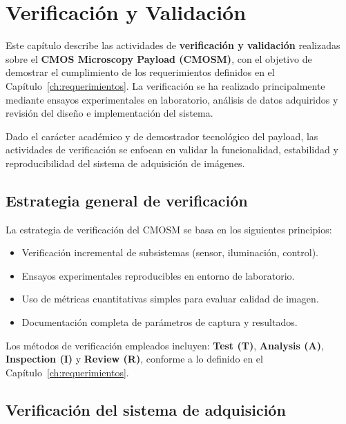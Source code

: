 \chapter{Verificación y Validación}
\label{ch:verificacion}

Este capítulo describe las actividades de \textbf{verificación y validación}
realizadas sobre el \textbf{CMOS Microscopy Payload (CMOSM)}, con el objetivo de
demostrar el cumplimiento de los requerimientos definidos en el
Capítulo~\ref{ch:requerimientos}. La verificación se ha realizado principalmente
mediante ensayos experimentales en laboratorio, análisis de datos adquiridos y
revisión del diseño e implementación del sistema.

Dado el carácter académico y de demostrador tecnológico del payload, las
actividades de verificación se enfocan en validar la funcionalidad, estabilidad y
reproducibilidad del sistema de adquisición de imágenes.

\section{Estrategia general de verificación}

La estrategia de verificación del CMOSM se basa en los siguientes principios:

\begin{itemize}
    \item Verificación incremental de subsistemas (sensor, iluminación,
    control).
    \item Ensayos experimentales reproducibles en entorno de laboratorio.
    \item Uso de métricas cuantitativas simples para evaluar calidad de imagen.
    \item Documentación completa de parámetros de captura y resultados.
\end{itemize}

Los métodos de verificación empleados incluyen:
\textbf{Test (T)}, \textbf{Analysis (A)}, \textbf{Inspection (I)} y
\textbf{Review (R)}, conforme a lo definido en el
Capítulo~\ref{ch:requerimientos}.

\section{Verificación del sistema de adquisición}

